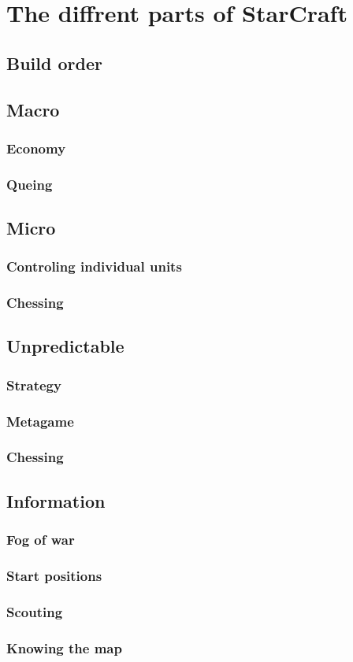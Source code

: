 \section{The diffrent parts of StarCraft}
\subsection{Build order}

\subsection{Macro}
\subsubsection{Economy}
\subsubsection{Queing}

\subsection{Micro}
\subsubsection{Controling individual units}
\subsubsection{Chessing}


\subsection{Unpredictable}
\subsubsection{Strategy}
\subsubsection{Metagame}
\subsubsection{Chessing}

\subsection{Information}
\subsubsection{Fog of war}
\subsubsection{Start positions}
\subsubsection{Scouting}
\subsubsection{Knowing the map}



